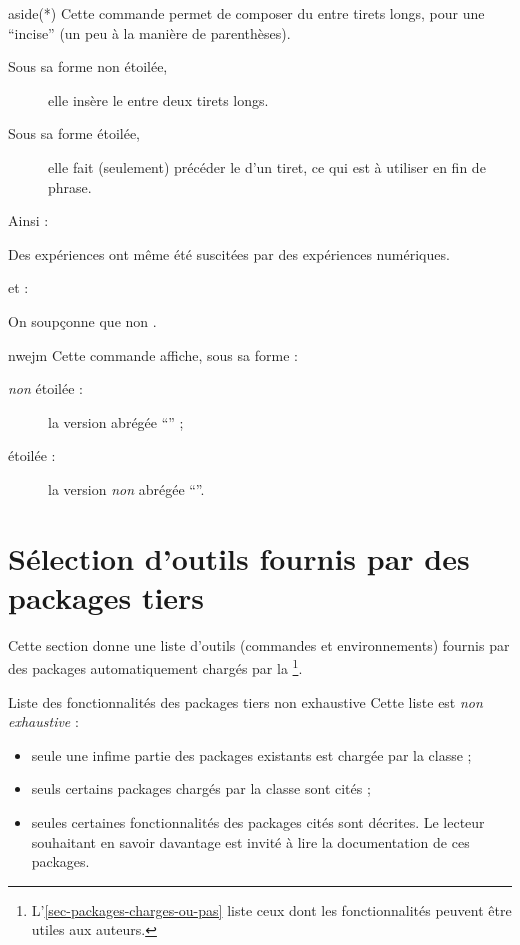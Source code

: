 \documentclass[french,nolocaltoc]{nwejmart}
\newtheorem[title=Fait,style=definition]{fact}
\begin{document}
\begin{docCommand}{aside(*)}{}
  Cette commande permet de composer du  entre tirets longs, pour une
  \enquote{incise} (un peu à la manière de parenthèses).
  \begin{description}
  \item[Sous sa forme non étoilée,] elle insère le  entre deux
    tirets longs.
  \item[Sous sa forme étoilée,] elle fait (seulement) précéder le 
    d'un tiret, ce qui est à utiliser en fin de phrase.
  \end{description}
  Ainsi :
\begin{bodycode}
Des expériences  ont même été
suscitées par des expériences numériques.
\end{bodycode}
  et :
\begin{bodycode}[listing and text,listing options={deletekeywords={exemple}}]
On soupçonne que non .
\end{bodycode}
\end{docCommand}

\begin{docCommand}{nwejm}{}
  Cette commande affiche, sous sa forme :
  \begin{description}
  \item[\emph{non} étoilée :] la version abrégée \enquote{\nwejm{}} ;
  \item[étoilée :] la version \emph{non} abrégée \enquote{\nwejm*{}}.
  \end{description}
\end{docCommand}

\section{Sélection d'outils fournis par des packages tiers}

Cette section donne une liste d'outils (commandes et environnements) fournis par
des packages automatiquement chargés par la
\nwejmauthorcl\footnote{L'\vref{sec-packages-charges-ou-pas} liste ceux dont les
  fonctionnalités peuvent être utiles aux auteurs.}.

\begin{dbwarning}{Liste des fonctionnalités des packages tiers non exhaustive}{}
  Cette liste est \emph{non exhaustive} :
  \begin{itemize}
  \item seule une infime partie des packages existants est chargée par la
    classe ;
  \item seuls certains packages chargés par la classe sont cités ;
  \item seules certaines fonctionnalités des packages cités sont décrites. Le
    lecteur souhaitant en savoir davantage est invité à lire la documentation de
    ces packages.
  \end{itemize}
\end{dbwarning}
\end{document}
